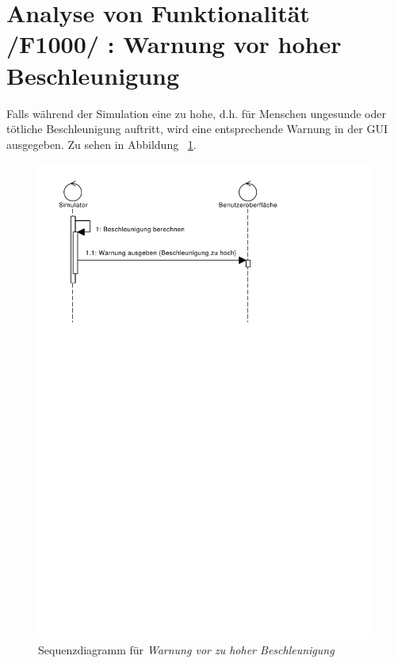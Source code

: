 \section{Analyse von Funktionalität /F1000/ :  Warnung vor hoher Beschleunigung}
Falls während der Simulation eine zu hohe, d.h. für Menschen ungesunde oder tötliche Beschleunigung auftritt, wird eine entsprechende Warnung in der GUI ausgegeben. Zu sehen in Abbildung ~\ref{fig:Warnung_Beschleunigung}.

\begin{figure}[h!]
\includegraphics[viewport = 0 20cm 25cm 30cm,width=\linewidth]{bilder/Warnung_Beschleunigung}
\caption{Sequenzdiagramm für \textit{Warnung vor zu hoher Beschleunigung}}
\label{fig:Warnung_Beschleunigung}
\end{figure}

\newpage

